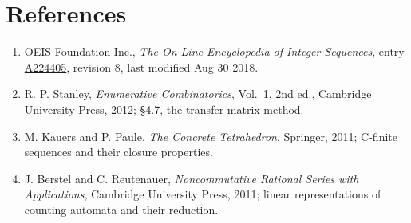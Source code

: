 \documentclass[11pt]{article}
\theoremstyle{definition}
\begin{document}
\section{References}

\begin{enumerate}

\item OEIS Foundation Inc., \emph{The On-Line Encyclopedia of Integer Sequences}, entry \href{https://oeis.org/A224405}{A224405}, revision 8, last modified Aug 30 2018.

\item R. P. Stanley, \emph{Enumerative Combinatorics}, Vol.~1, 2nd ed., Cambridge University Press, 2012; \S4.7, the transfer-matrix method.

\item M. Kauers and P. Paule, \emph{The Concrete Tetrahedron}, Springer, 2011; C-finite sequences and their closure properties.

\item J. Berstel and C. Reutenauer, \emph{Noncommutative Rational Series with Applications}, Cambridge University Press, 2011; linear representations of counting automata and their reduction.

\end{enumerate}
\end{document}
